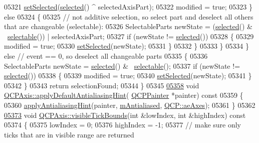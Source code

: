 \begin{DoxyCode}
05321         \hyperlink{a00025_a24c13908da2f8d629b1bbbe9cbd63e39}{setSelected}(\hyperlink{a00025_a534509949b91a6aa08e38cca48b62c9e}{selected}() ^ selectedAxisPart);
05322         modified = \textcolor{keyword}{true};
05323       \} \textcolor{keywordflow}{else}
05324       \{
05325         \textcolor{comment}{// not additive selection, so select part and deselect all others that are changeable (selectable):}
05326         SelectableParts newState = (\hyperlink{a00025_a534509949b91a6aa08e38cca48b62c9e}{selected}() & ~\hyperlink{a00025_a4e83e383fb5fbd9cf3759fab68f79aa6}{selectable}()) | selectedAxisPart;
05327         \textcolor{keywordflow}{if} (newState != \hyperlink{a00025_a534509949b91a6aa08e38cca48b62c9e}{selected}())
05328         \{
05329           modified = \textcolor{keyword}{true};
05330           \hyperlink{a00025_a24c13908da2f8d629b1bbbe9cbd63e39}{setSelected}(newState);
05331         \}
05332       \}
05333     \}
05334   \} \textcolor{keywordflow}{else} \textcolor{comment}{// event == 0, so deselect all changeable parts}
05335   \{
05336     SelectableParts newState = \hyperlink{a00025_a534509949b91a6aa08e38cca48b62c9e}{selected}() & ~\hyperlink{a00025_a4e83e383fb5fbd9cf3759fab68f79aa6}{selectable}();
05337     \textcolor{keywordflow}{if} (newState != \hyperlink{a00025_a534509949b91a6aa08e38cca48b62c9e}{selected}())
05338     \{
05339       modified = \textcolor{keyword}{true};
05340       \hyperlink{a00025_a24c13908da2f8d629b1bbbe9cbd63e39}{setSelected}(newState);
05341     \}
05342   \}
05343   \textcolor{keywordflow}{return} selectionFound;
05344 \}
05345 
\hypertarget{a00115_source_l05358}{}\hyperlink{a00025_a13bde39eb1e0b7c14a02935689be8aba}{05358} \textcolor{keywordtype}{void} \hyperlink{a00025_a13bde39eb1e0b7c14a02935689be8aba}{QCPAxis::applyDefaultAntialiasingHint}(
      \hyperlink{a00047}{QCPPainter} *painter)\textcolor{keyword}{ const}
05359 \textcolor{keyword}{}\{
05360   \hyperlink{a00044_a62bd552d1a45aa9accb24b310542279e}{applyAntialiasingHint}(painter, \hyperlink{a00044_a3ab45a4c76a3333ce42eb217a81733ec}{mAntialiased}, 
      \hyperlink{a00143_ae55dbe315d41fe80f29ba88100843a0caefa92e89cd37f8a081fd2075aa1af73f}{QCP::aeAxes});
05361 \}
05362 
\hypertarget{a00115_source_l05373}{}\hyperlink{a00025_a06320a944d1120732cc0d72fe1306d8b}{05373} \textcolor{keywordtype}{void} \hyperlink{a00025_a06320a944d1120732cc0d72fe1306d8b}{QCPAxis::visibleTickBounds}(\textcolor{keywordtype}{int} &lowIndex, \textcolor{keywordtype}{int} &highIndex)\textcolor{keyword}{ const}
05374 \textcolor{keyword}{}\{
05375   lowIndex = 0;
05376   highIndex = -1;
05377   \textcolor{comment}{// make sure only ticks that are in visible range are returned}

\end{DoxyCode}
